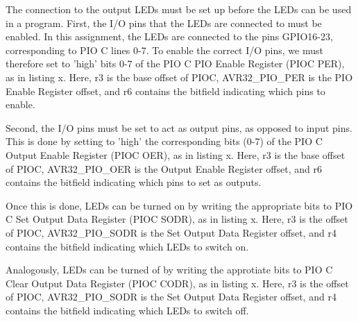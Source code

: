 The connection to the output LEDs must be set up before the LEDs can be used in a program.
First, the I/O pins that the LEDs are connected to must be enabled.
In this assignment, the LEDs are connected to the pins GPIO16-23, corresponding to PIO C lines 0-7.
To enable the correct I/O pins, we must therefore set to 'high' bits 0-7 of the PIO C PIO Enable Register (PIOC PER), as in listing x.
Here, r3 is the base offset of PIOC, AVR32\_PIO\_PER is the PIO Enable Register offset, and r6 contains the bitfield indicating which pins to enable.




Second, the I/O pins must be set to act as output pins, as opposed to input pins.
This is done by setting to 'high' the corresponding bits (0-7) of the PIO C Output Enable Register (PIOC OER), as in listing x.
Here, r3 is the base offset of PIOC, AVR32\_PIO\_OER is the Output Enable Register offset, and r6 contains the bitfield indicating which pins to set as outputs.


Once this is done, LEDs can be turned on by writing the appropriate bits to PIO C Set Output Data Register (PIOC SODR), as in listing x.
Here, r3 is the offset of PIOC, AVR32\_PIO\_SODR is the Set Output Data Register offset, and r4 contains the bitfield indicating which LEDs to switch on.


Analogously, LEDs can be turned of by writing the approtiate bits to PIO C Clear Output Data Register (PIOC CODR), as in listing x. 
Here, r3 is the offset of PIOC, AVR32\_PIO\_SODR is the Set Output Data Register offset, and r4 contains the bitfield indicating which LEDs to switch off.


